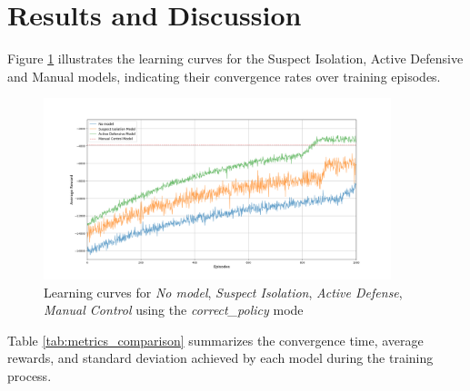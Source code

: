 \documentclass[conference]{IEEEtran}
\begin{document}
\section{Results and Discussion}\label{sec:results_and_discussion}

Figure \ref{fig:learning_curves} illustrates the learning curves for the Suspect Isolation, Active Defensive and Manual models, indicating their convergence rates over training episodes.

\begin{figure}[ht]
    \centering
    \includegraphics[width=0.9\textwidth]{figures/learning_curves.png}
    \caption{Learning curves for \textit{No model}, \textit{Suspect Isolation}, \textit{Active Defense}, \textit{Manual Control} using the \textit{correct\_policy} mode}
    \label{fig:learning_curves}
\end{figure}

Table \ref{tab:metrics_comparison} summarizes the convergence time, average rewards, and standard deviation achieved by each model during the training process.
\end{document}
